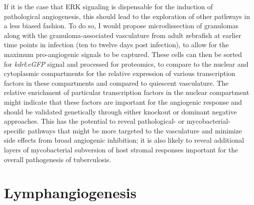 If it is the case that ERK signaling is dispensable for the induction of pathological angiogenesis, this should lead to the exploration of other pathways in a less biased fashion. To do so, I would propose microdissection of granulomas along with the granuloma\hyp{}associated vasculature from adult zebrafish at earlier time points in infection (ten to twelve days post infection), to allow for the maximum pro\hyp{}angiogenic signals to be captured. These cells can then be sorted for \textit{kdrl}:\textit{eGFP} signal and processed for proteomics, to compare to the nuclear and cytoplasmic compartments for the relative expression of various transcription factors in these compartments and compared to quiescent vasculature. The relative enrichment of particular transcription factors in the nuclear compartment might indicate that these factors are important for the angiogenic response and should be validated genetically through either knockout or dominant negative approaches. This has the potential to reveal pathological\hyp{} or mycobacterial\hyp{}specific pathways that might be more targeted to the vasculature and minimize side effects from broad angiogenic inhibition; it is also likely to reveal additional layers of mycobacterial subversion of host stromal responses important for the overall pathogenesis of tuberculosis.

\section{Lymphangiogenesis}\label{lymphangiogenesis}

